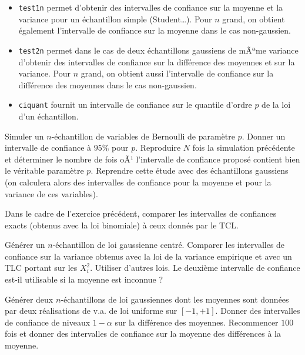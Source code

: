 \begin{itemize}
\item \texttt{test1n} permet d'obtenir des intervalles de confiance sur la
  moyenne et la variance pour un échantillon simple (Student\ldots). Pour $n$
  grand, on obtient également l'intervalle de confiance sur la moyenne dans le
  cas non-gaussien.
\item \texttt{test2n} permet dans le cas de deux échantillons gaussiens de
  mÃªme variance d'obtenir des intervalles de confiance sur la différence des
  moyennes et sur la variance. Pour $n$ grand, on obtient aussi l'intervalle
  de confiance sur la différence des moyennes dans le cas non-gaussien.
\item \texttt{ciquant} fournit un intervalle de confiance sur le quantile
  d'ordre $p$ de la loi d'un échantillon.
\end{itemize}

\begin{exo}
  Simuler un $n$-échantillon de variables de Bernoulli de paramètre $p$.
  Donner un intervalle de confiance à $95\%$ pour $p$. Reproduire $N$ fois la
  simulation précédente et déterminer le nombre de fois oÃ¹ l'intervalle de
  confiance proposé contient bien le véritable paramètre $p$. Reprendre cette
  étude avec des échantillons gaussiens (on calculera alors des intervalles de
  confiance pour la moyenne et pour la variance de ces variables).
\end{exo}

\begin{exo}
  Dans le cadre de l'exercice précédent, comparer les intervalles de
  confiances exacts (obtenus avec la loi binomiale) à ceux donnés par le TCL.
\end{exo}

\begin{exo}
  Générer un $n$-échantillon de loi gaussienne centré. Comparer les
  intervalles de confiance sur la variance obtenus avec la loi de la variance
  empirique et avec un TLC portant sur les $X_i^2$. Utiliser d'autres lois. Le
  deuxième intervalle de confiance est-il utilisable si la moyenne est
  inconnue ?
\end{exo}

\begin{exo}
  Générer deux $n$-échantillons de loi gaussiennes dont les moyennes sont
  données par deux réalisations de v.a. de loi uniforme sur $[-1,+1]$. Donner
  des intervalles de confiance de niveaux $1-\alpha$ sur la différence des
  moyennes. Recommencer $100$ fois et donner des intervalles de confiance sur
  la moyenne des différences à la moyenne.
\end{exo}

